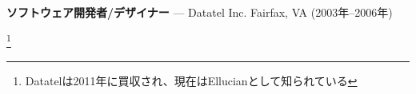 \documentclass{article}
\begin{document}
\begin{list}{}{
    \setlength{\leftmargin}{0cm}	%
    \setlength{\parsep}{0.15cm}
}
\begin{itemize}

    \end{itemize}

    \pagebreak

    \item \textbf{\large ソフトウェア開発者/デザイナー} --- Datatel Inc.
        Fairfax, VA (2003年--2006年)

    \footnote{Datatelは2011年に買収され、現在はEllucianとして知られている}


\end{list}
\end{document}
